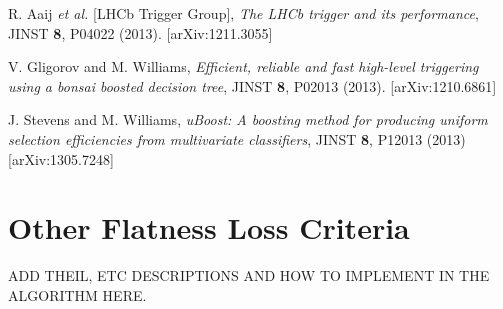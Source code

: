 \documentclass{JINST}
\theoremstyle{definition}
\theoremstyle{remark}
\begin{document}
\begin{thebibliography}{9}

 R. Aaij {\em et al.} [LHCb Trigger Group], {\em The LHCb trigger and its performance}, JINST {\bf 8}, P04022 (2013). [arXiv:1211.3055]

  V. Gligorov and M. Williams, {\em Efficient, reliable and fast high-level triggering using a bonsai boosted decision tree}, JINST {\bf 8}, P02013 (2013). [arXiv:1210.6861]

 J. Stevens and M. Williams, {\em uBoost: A boosting method for producing uniform selection efficiencies from multivariate classifiers}, JINST {\bf 8}, P12013 (2013) [arXiv:1305.7248]


\end{thebibliography}

\appendix
\section{Other Flatness Loss Criteria}

ADD THEIL, ETC DESCRIPTIONS AND HOW TO IMPLEMENT IN THE ALGORITHM HERE.
\end{document}
